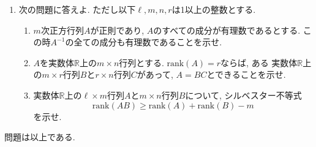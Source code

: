 \documentclass[dvipdfmx,a4paper,11pt]{article}
\newcommand{\R}{\mathbb{R}}
\theoremstyle{definition}
\begin{document}
\begin{enumerate}[label={\Large \textbf{第}\arabic*\textbf{問}.}]
 \item 次の問題に答えよ. ただし以下$\ell, m, n, r$は1以上の整数とする. 
 \begin{enumerate}[label=(\arabic*)]
 \setlength{\parskip}{0cm} %
  \setlength{\itemsep}{0cm}
  \item $m$次正方行列$A$が正則であり, $A$のすべての成分が有理数であるとする. この時$A^{-1}$の全ての成分も有理数であることを示せ. 
 \item $A$を実数体$\R$上の$m \times n$行列とする. 
 $\mathrm{rank}(A)=r$ならば, ある
 実数体$\R$上の$m\times r$行列$B$と$r \times n$行列$C$があって, $A=BC$とできることを示せ.
    \item 実数体$\R$上の$\ell \times m$行列$A$と$m \times n$行列$B$について, シルベスター不等式
    $$\mathrm{rank}(AB) \ge \mathrm{rank}(A) + \mathrm{rank}(B) - m$$
    を示せ.
 \end{enumerate} 

   \end{enumerate} 

  \begin{flushright}
\LARGE{問題は以上である. }
\end{flushright}

 
\end{document}
